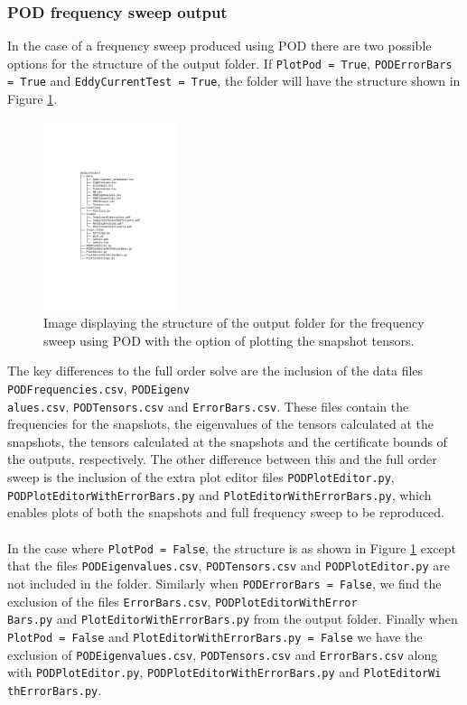 \subsubsection{POD frequency sweep output}
In the case of a frequency sweep produced using POD there are two possible options for the structure of the output folder. If \texttt{PlotPod = True}, \texttt{PODErrorBars = True} and \texttt{EddyCurrentTest = True}, the folder will have the structure shown in Figure \ref{fig:PlotPodOutput}.
\begin{figure}[H]
\begin{center}
\includegraphics[width=0.35\textwidth]{Figures/PodOutput}
\caption{Image displaying the structure of the output folder for the frequency sweep using POD with the option of plotting the snapshot tensors.}\label{fig:PlotPodOutput}
\end{center}
\end{figure}
\noindent
The key differences to the full order solve are the inclusion of the data files \texttt{PODFrequencies.csv}, \texttt{PODEigenv\\alues.csv}, \texttt{PODTensors.csv} and \texttt{ErrorBars.csv}. These files contain the frequencies for the snapshots, the eigenvalues of the tensors calculated at the snapshots, the tensors calculated at the snapshots and the certificate bounds of the outputs, respectively. The other difference between this and the full order sweep is the inclusion of the extra plot editor files \texttt{PODPlotEditor.py}, \texttt{PODPlotEditorWithErrorBars.py} and \texttt{PlotEditorWithErrorBars.py}, which enables plots of both the snapshots and full frequency sweep to be reproduced.\\
\\
In the case where \texttt{PlotPod = False},  the structure is as shown in Figure \ref{fig:PlotPodOutput}  except that the files \texttt{PODEigenvalues.csv}, \texttt{PODTensors.csv} and \texttt{PODPlotEditor.py} are not included in the folder. Similarly when \texttt{PODErrorBars = False}, we find the exclusion of the files \texttt{ErrorBars.csv}, \texttt{PODPlotEditorWithError\\Bars.py} and \texttt{PlotEditorWithErrorBars.py} from the output folder. Finally when \texttt{PlotPod  = False} and \texttt{PlotEditorWithErrorBars.py = False} we have the exclusion of \texttt{PODEigenvalues.csv}, \texttt{PODTensors.csv} and \texttt{ErrorBars.csv} along with \texttt{PODPlotEditor.py}, \texttt{PODPlotEditorWithErrorBars.py} and \texttt{PlotEditorWi\\thErrorBars.py}.\\
